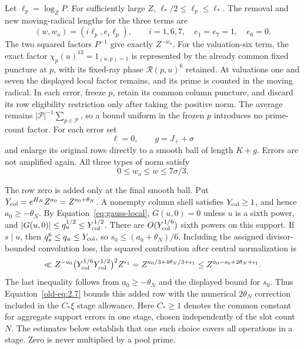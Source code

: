 \documentclass[11pt,a4paper]{article}
\numberwithin{equation}{section}
\numberwithin{figure}{section}
\theoremstyle{definition}
\theoremstyle{remark}
\begin{document}
Let \(\ell_p=\log_ZP\).  For sufficiently large \(Z\),
\(\ell_*/2\le\ell_p\le\ell_*\).  The removal and new
moving-radical lengths for the three terms are
\begin{equation}
 (w,w_o)=(i\ell_p,e_i\ell_p),\qquad
 i=1,6,7,\quad e_1=e_7=1,\quad e_6=0.
 \label{old-eq:2.9}
\end{equation}
The two squared factors \(P^{-1}\) give exactly \(Z^{-w_o}\).
For the valuation-six term, the exact factor
\(\chi_p(u)^{12}=1_{(u,p)=1}\) is represented by the already
common fixed puncture at \(p\), with its fixed-ray phase \(\mathcal R(p,u)^6\) retained.
At valuations one and seven the displayed local factor remains, and its
prime is counted in the moving radical.  In each
error, freeze \(p\), retain its common
column puncture, and discard its row eligibility restriction only
after taking the positive norm.  The average remains
\(|\mathcal P|^{-1}\sum_{p\in\mathcal P}\), so a bound uniform in
the frozen \(p\) introduces no prime-count factor.  For each error
set
\[
 \ell=0,\qquad g=J_++\sigma
\]
and enlarge its original rows directly to a smooth ball of length
\(K+g\).  Errors are not amplified again.  All three types of
norm satisfy
\begin{equation}
 0\le w_o\le w\le7\sigma/3.
 \label{old-eq:2.10}
\end{equation}

The row zero is added only at the final smooth ball.  Put
\(Y_{\rm col}=e^{H_N}Z^{a_0}=Z^{a_0+\theta_N}\).  A nonempty column
shell satisfies \(Y_{\rm col}\ge1\), and hence \(a_0\ge-\theta_N\).
By Equation~\eqref{eq:gauss-local}, \(G(u,0)=0\) unless \(u\) is a
sixth power, and \(|G(u,0)|\le q_u^{1/2}\le Y_{\rm col}^{1/2}\).
There are \(O(Y_{\rm col}^{1/6})\) sixth powers on this support.
If \(s\mid u\), then \(q_s^6\le q_u\le Y_{\rm col}\), so
\(s_0\le(a_0+\theta_N)/6\).  Including the assigned divisor-bounded
convolution loss, the squared contribution after central normalization is
\[
 \ll Z^{-a_0}\bigl(Y_{\rm col}^{1/6}Y_{\rm col}^{1/2}\bigr)^2
          Z^{\epsilon_1}
 =Z^{a_0/3+4\theta_N/3+\epsilon_1}
 \le Z^{a_0-s_0+2\theta_N+\epsilon_1}.
\]
The last inequality follows from \(a_0\ge-\theta_N\) and the displayed
bound for \(s_0\).  Thus Equation~\eqref{old-eq:2.7} bounds this added
row with the numerical \(2\theta_N\) correction included in the
\(C_*\xi\) stage allowance.  Here \(C_*\ge1\) denotes the common
constant for aggregate support errors in one stage, chosen independently
of the slot count \(N\).  The estimates below establish that one such
choice covers all operations in a stage.  Zero is never multiplied by a
pool prime.
\end{document}
